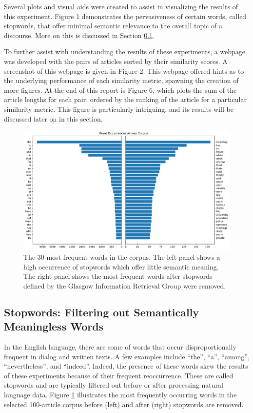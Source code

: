 \documentclass[11pt]{article}
\begin{document}
Several plots and visual aids were created to assist in visualizing the results of this experiment.
Figure 1 demonstrates the pervasiveness of certain words, called stopwords, that offer minimal semantic relevance to the overall topic of a discourse.
More on this is discussed in Section \ref{sec:stopwords}.

To further assist with understanding the results of these experiments, a webpage was developed with the pairs of articles sorted by their similarity scores.
A screenshot of this webpage is given in Figure 2.
This webpage offered hints as to the underlying performance of each similarity metric, spawning the creation of more figures.
At the end of this report is Figure 6, which plots the sum of the article lengths for each pair, ordered by the ranking of the article for a particular similarity metric.
This figure is particularly intriguing, and its results will be discussed later on in this section.


\begin{figure}[h] \label{fig:stopwords}
  \centering
  \includegraphics[width=\textwidth]{figures/stopwords}
  \caption{The 30 most frequent words in the corpus. The left panel shows a high occurrence of stopwords which offer little semantic meaning. The right panel shows the most frequent words after stopwords defined by the Glasgow Information Retrieval Group were removed.}
\end{figure}

\subsection{Stopwords: Filtering out Semantically Meaningless Words} \label{sec:stopwords}

In the English language, there are some of words that occur disproportionally frequent in dialog and written texts.
A few examples include ``the'', ``a'', ``among'', ``nevertheless'', and ``indeed''.
Indeed, the presence of these words skew the results of these experiments because of their frequent reoccurrence.
These are called stopwords and are typically filtered out before or after processing natural language data.
Figure \ref{fig:stopwords} illustrates the most frequently occurring words in the selected 100-article corpus before (left) and after (right) stopwords are removed.
\end{document}
